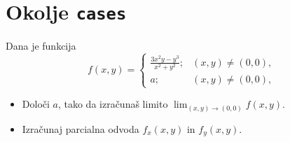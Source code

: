 \documentclass[a4paper,12pt]{article}
\begin{document}
\section*{Okolje \texttt{cases}}
Dana je funkcija
\begin{equation*}
   f(x,y)= \begin{cases}
   \frac{3x^2y-y^3}{x^2+y^2}; & (x,y)\neq(0,0), \\
   a; & (x,y)\neq(0,0), 
\end{cases}
\end{equation*}
\begin{itemize}
\item Določi \(a\), tako da izračunaš limito \( \lim_{(x,y)\to(0,0)} f(x,y) \).
\item Izračunaj parcialna odvoda \(f_x(x,y)\) in \(f_y(x,y)\).
\end{itemize}
\end{document}
